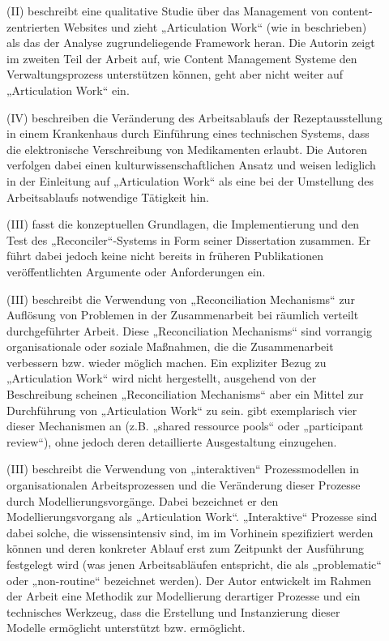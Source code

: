 \begin{description}
	\item[\citet{Eschenfelder03}] (II) beschreibt eine qualitative Studie über das Management von content-zentrierten Websites und zieht „Articulation Work“ (wie in \citep{Corbin93} beschrieben) als das der Analyse zugrundeliegende Framework heran. Die Autorin zeigt im zweiten Teil der Arbeit auf, wie Content Management Systeme den Verwaltungsprozess unterstützen können, geht aber nicht weiter auf „Articulation Work“ ein.
	\item[\citet{Olesen03}] (IV) beschreiben die Veränderung des Arbeitsablaufs der Rezeptausstellung in einem Krankenhaus durch Einführung eines technischen Systems, dass die elektronische Verschreibung von Medikamenten erlaubt. Die Autoren verfolgen dabei einen kulturwissenschaftlichen Ansatz und weisen lediglich in der Einleitung auf „Articulation Work“ als eine bei der Umstellung des Arbeitsablaufs notwendige Tätigkeit hin.
	\item[\citet{Sarini03}] (III) fasst die konzeptuellen Grundlagen, die Implementierung und den Test des „Reconciler“-Systems in Form seiner Dissertation zusammen. Er führt dabei jedoch keine nicht bereits in früheren Publikationen veröffentlichten Argumente oder Anforderungen ein.
	\item[\citet{Gerson04}] (III) beschreibt die Verwendung von „Reconciliation Mechanisms“ zur Auflösung von Problemen in der Zusammenarbeit bei räumlich verteilt durchgeführter Arbeit. Diese „Reconciliation Mechanisms“ sind vorrangig organisationale oder soziale Maßnahmen, die die Zusammenarbeit verbessern bzw. wieder möglich machen. Ein expliziter Bezug zu „Articulation Work“ wird nicht hergestellt, ausgehend von der Beschreibung scheinen „Reconciliation Mechanisms“ aber ein Mittel zur Durchführung von „Articulation Work“ zu sein. \citeauthor{Gerson04} gibt exemplarisch vier dieser Mechanismen an (z.B. „shared ressource pools“ oder „participant review“), ohne jedoch deren detaillierte Ausgestaltung einzugehen.
	\item[\citet{Jorgensen04}] (III) beschreibt die Verwendung von „interaktiven“ Prozessmodellen in organisationalen Arbeitsprozessen und die Veränderung dieser Prozesse durch Modellierungsvorgänge. Dabei bezeichnet er den Modellierungsvorgang als „Articulation Work“. „Interaktive“ Prozesse sind dabei solche, die wissensintensiv sind, im im Vorhinein spezifiziert werden können und deren konkreter Ablauf erst zum Zeitpunkt der Ausführung festgelegt wird (was jenen Arbeitsabläufen entspricht, die als „problematic“ oder „non-routine“ bezeichnet werden). Der Autor entwickelt im Rahmen der Arbeit eine Methodik zur Modellierung derartiger Prozesse und ein technisches Werkzeug, dass die Erstellung und Instanzierung dieser Modelle ermöglicht unterstützt bzw. ermöglicht.

\end{description}
